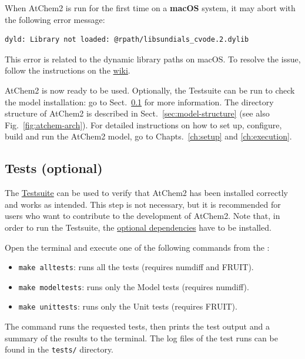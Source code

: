 When AtChem2 is run for the first time on a \textbf{macOS} system, it may abort with the
following error message:

\begin{Verbatim}[fontsize=\small]
  dyld: Library not loaded: @rpath/libsundials_cvode.2.dylib
\end{Verbatim}

This error is related to the dynamic library paths on macOS. To resolve the issue, follow the
instructions on the \href{https://github.com/AtChem/AtChem2/wiki/Known-Issues}{wiki}.

AtChem2 is now ready to be used. Optionally, the Testsuite can be run to check the model
installation: go to Sect.~\ref{subsec:tests-optional} for more information. The directory
structure of AtChem2 is described in Sect.~\ref{sec:model-structure} (see also
Fig.~\ref{fig:atchem-arch}). For detailed instructions on how to set up, configure, build and
run the AtChem2 model, go to Chapts.~\ref{ch:setup} and \ref{ch:execution}.

\subsection{Tests (optional)} \label{subsec:tests-optional}

The \hyperref[sec:testsuite]{Testsuite} can be used to verify that AtChem2 has been installed
correctly and works as intended. This step is not necessary, but it is recommended for users
who want to contribute to the development of AtChem2. Note that, in order to run the Testsuite,
the \hyperref[subsec:optional-dependencies]{optional dependencies} have to be installed.

Open the terminal and execute one of the following commands from the \maindir:

\begin{itemize}
\item \verb|make alltests|: runs all the tests (requires numdiff and FRUIT).
\item \verb|make modeltests|: runs only the Model tests (requires numdiff).
\item \verb|make unittests|: runs only the Unit tests (requires FRUIT).
\end{itemize}

The command runs the requested tests, then prints the test output and a summary of the results
to the terminal. The log files of the test runs can be found in the \texttt{tests/} directory.

